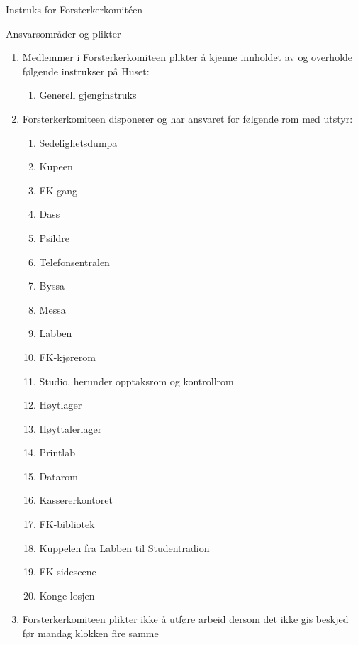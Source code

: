 \begin{instruks*}{Instruks for Forsterkerkomit\'een}
    \begin{instruksledd}{Ansvarsområder og plikter}
        \begin{enumerate}
            \item Medlemmer i Forsterkerkomiteen plikter å kjenne innholdet av og overholde følgende
                instrukser på Huset:
                \begin{enumerate}
                    \item Generell gjenginstruks
                \end{enumerate}
            \item Forsterkerkomiteen disponerer og har ansvaret for følgende rom med utstyr:
                \begin{enumerate}
                    \item Sedelighetsdumpa
                    \item Kupeen
                    \item FK-gang
                    \item Dass
                    \item Psildre
                    \item Telefonsentralen
                    \item Byssa
                    \item Messa
                    \item Labben
                    \item FK-kjørerom
                    \item Studio, herunder opptaksrom og kontrollrom
                    \item Høytlager
                    \item Høyttalerlager
                    \item Printlab
                    \item Datarom
                    \item Kassererkontoret
                    \item FK-bibliotek
                    \item Kuppelen fra Labben til Studentradion
                    \item FK-sidescene
                    \item Konge-losjen
                \end{enumerate}
            \item Forsterkerkomiteen plikter ikke å utføre arbeid dersom det ikke gis beskjed
                før mandag klokken fire samme

\end{enumerate}
\end{instruksledd}
\end{instruks*}
